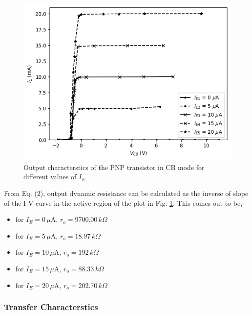     \begin{figure}[H]
        \centering
            \includegraphics[width=\columnwidth]{images/g5.png}
           \caption{Output characterstics of the PNP transistor in CB mode for different values of $I_{E}$}
           \label{graph:5}
   \end{figure}

   

    From Eq. (2), output dynamic resistance can be calculated as the inverse of slope of the I-V curve in the active region of the plot in Fig. \ref{graph:5}. This comes out to be, 

    \begin{itemize}
        \item for $I_E=0\,\mu$A, $r_o=9700.00\,k\Omega$ 
        \item for $I_E=5\,\mu$A, $r_o=18.97\,k\Omega$ 
        \item for $I_E=10\,\mu$A, $r_o=192\,k\Omega$ 
        \item for $I_E=15\,\mu$A, $r_o=88.33\,k\Omega$ 
        \item for $I_E=20\,\mu$A, $r_o=202.70\,k\Omega$ 
    \end{itemize}

    \subsubsection*{\textbf{Transfer Characterstics}} 

